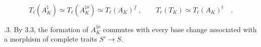 \begin{equation}\tag{7.6.2}
T_{\ell}(A_K^{\natural}) \simeq T_{\ell}(A_K^{\natural o})
 \simeq T_{\ell}(A_K)^f \; , \qquad
T_{\ell}(T_K) \simeq T_{\ell}(A_K)^t \quad .
\end{equation}

\medskip
{}.3. By 3.3, the formation of $A_K^{\natural o}$ commutes with
every base change associated with a morphism of complete traits
$S'\longrightarrow S$.

